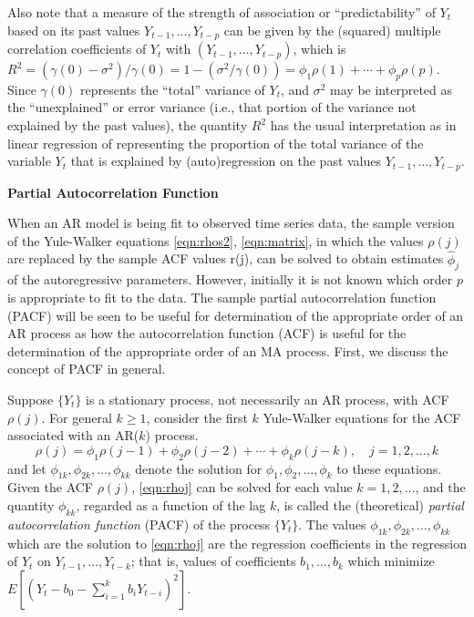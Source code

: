Also note that a measure of the strength of association or ``predictability'' of $Y_t$ based on its past values $Y_{t-1}, \ldots, Y_{t-p}$ can be given by the (squared) multiple correlation coefficients of $Y_t$ with $(Y_{t-1}, \ldots, Y_{t-p})$, which is $R^2= (\gamma(0) - \sigma^2)/\gamma(0) = 1 - ( \sigma^2 / \gamma(0) ) = \phi_1 \rho(1) + \cdots + \phi_p \rho(p)$. Since $\gamma(0)$ represents the ``total'' variance of $Y_t$, and $\sigma^2$ may be interpreted as the ``unexplained'' or error variance (i.e., that portion of the variance not explained by the past values), the quantity $R^2$ has the usual interpretation as in linear regression of representing the proportion of the total variance of the variable $Y_t$ that is explained by (auto)regression on the past values $Y_{t-1}, \ldots, Y_{t-p}$. \twomedskip


\noindent\textbf{Partial Autocorrelation Function} \twomedskip


When an AR model is being fit to observed time series data, the sample version of the Yule-Walker equations \eqref{eqn:rhos2}, \eqref{eqn:matrix}, in which the values $\rho(j)$ are replaced by the sample ACF values r(j), can be solved to obtain estimates $\hat{\phi}_j$ of the autoregressive parameters. However, initially it is not known which order $p$ is appropriate to fit to the data. The sample partial autocorrelation function (PACF) will be seen to be useful for determination of the appropriate order of an AR process as how the autocorrelation function (ACF) is useful for the determination of the appropriate order of an MA process. First, we discuss the concept of PACF in general.


Suppose $\{ Y_t \}$ is a stationary process, not necessarily an AR process, with ACF $\rho(j)$. For general $k \geq 1$, consider the first $k$ Yule-Walker equations for the ACF associated with an AR($k$) process.
	\begin{equation} \label{eqn:rhoj}
	\rho(j) = \phi_1 \rho(j-1) + \phi_2 \rho(j-2) + \cdots + \phi_k \rho(j-k), \quad j = 1, 2,\ldots, k
	\end{equation}
and let $\phi_{1k}, \phi_{2k}, \ldots, \phi_{kk}$ denote the solution for $\phi_1, \phi_2, \ldots, \phi_k$ to these equations. Given the ACF $\rho(j)$, \eqref{eqn:rhoj} can be solved for each value $k= 1,2, \ldots$, and the quantity $\phi_{kk}$, regarded as a function of the lag $k$, is called the (theoretical) \emph{partial autocorrelation function} (PACF) of the process $\{ Y_t \}$. The values $\phi_{1k},  \phi_{2k}, \ldots, \phi_{kk}$ which are the solution to \eqref{eqn:rhoj} are the regression coefficients in the regression of $Y_t$ on $Y_{t-1}, \ldots, Y_{t-k}$; that is, values of coefficients $b_1, \ldots, b_k$ which minimize $E[(Y_t - b_0 - \sum_{i=1}^k b_iY_{t-i})^2]$.


